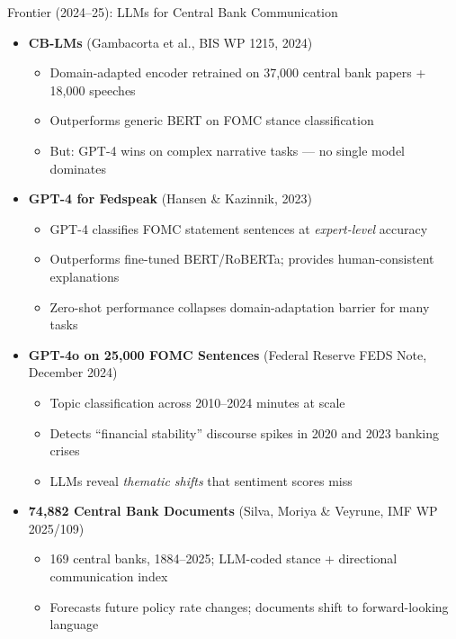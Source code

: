 \documentclass[10pt,english,aspectratio=169]{beamer}
\begin{document}
\begin{frame}{Frontier (2024--25): LLMs for Central Bank Communication}
\begin{itemize}
\item \textbf{CB-LMs} (Gambacorta et al., BIS WP 1215, 2024)
\begin{itemize}
    \item Domain-adapted encoder retrained on 37{,}000 central bank papers + 18{,}000 speeches
    \item Outperforms generic BERT on FOMC stance classification
    \item But: GPT-4 wins on complex narrative tasks --- no single model dominates
\end{itemize}

\medskip
\item \textbf{GPT-4 for Fedspeak} (Hansen \& Kazinnik, 2023)
\begin{itemize}
    \item GPT-4 classifies FOMC statement sentences at \emph{expert-level} accuracy
    \item Outperforms fine-tuned BERT/RoBERTa; provides human-consistent explanations
    \item Zero-shot performance collapses domain-adaptation barrier for many tasks
\end{itemize}

\medskip
\item \textbf{GPT-4o on 25{,}000 FOMC Sentences} (Federal Reserve FEDS Note, December 2024)
\begin{itemize}
    \item Topic classification across 2010--2024 minutes at scale
    \item Detects ``financial stability'' discourse spikes in 2020 and 2023 banking crises
    \item LLMs reveal \emph{thematic shifts} that sentiment scores miss
\end{itemize}

\medskip
\item \textbf{74{,}882 Central Bank Documents} (Silva, Moriya \& Veyrune, IMF WP 2025/109)
\begin{itemize}
    \item 169 central banks, 1884--2025; LLM-coded stance + directional communication index
    \item Forecasts future policy rate changes; documents shift to forward-looking language
\end{itemize}
\end{itemize}
\end{frame}
\end{document}

